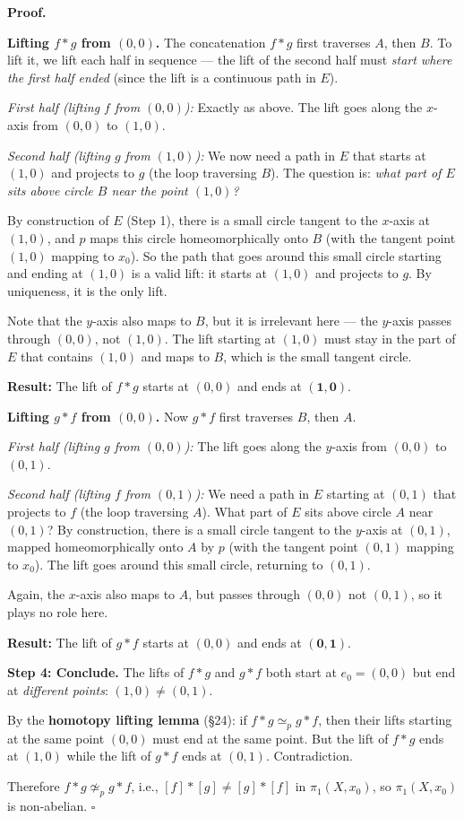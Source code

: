 \documentclass[11pt]{report}
\renewenvironment{proof}[1][Proof]{\noindent\textbf{#1.} }{\hfill$\square$\par\vspace{5pt}}
\begin{document}
\begin{proof}
\medskip

\textbf{Lifting $f * g$ from $(0,0)$.} The concatenation $f * g$ first traverses $A$, then $B$. To lift it, we lift each half in sequence --- the lift of the second half must \emph{start where the first half ended} (since the lift is a continuous path in $E$).

\textit{First half (lifting $f$ from $(0,0)$):} Exactly as above. The lift goes along the $x$-axis from $(0,0)$ to $(1,0)$.

\textit{Second half (lifting $g$ from $(1,0)$):} We now need a path in $E$ that starts at $(1,0)$ and projects to $g$ (the loop traversing $B$). The question is: \emph{what part of $E$ sits above circle $B$ near the point $(1,0)$?}

By construction of $E$ (Step 1), there is a small circle tangent to the $x$-axis at $(1,0)$, and $p$ maps this circle homeomorphically onto $B$ (with the tangent point $(1,0)$ mapping to $x_0$). So the path that goes around this small circle starting and ending at $(1,0)$ is a valid lift: it starts at $(1,0)$ and projects to $g$. By uniqueness, it is the only lift.

Note that the $y$-axis also maps to $B$, but it is irrelevant here --- the $y$-axis passes through $(0,0)$, not $(1,0)$. The lift starting at $(1,0)$ must stay in the part of $E$ that contains $(1,0)$ and maps to $B$, which is the small tangent circle.

\textbf{Result:} The lift of $f * g$ starts at $(0,0)$ and ends at $\mathbf{(1,0)}$.

\medskip

\textbf{Lifting $g * f$ from $(0,0)$.} Now $g * f$ first traverses $B$, then $A$.

\textit{First half (lifting $g$ from $(0,0)$):} The lift goes along the $y$-axis from $(0,0)$ to $(0,1)$.

\textit{Second half (lifting $f$ from $(0,1)$):} We need a path in $E$ starting at $(0,1)$ that projects to $f$ (the loop traversing $A$). What part of $E$ sits above circle $A$ near $(0,1)$? By construction, there is a small circle tangent to the $y$-axis at $(0,1)$, mapped homeomorphically onto $A$ by $p$ (with the tangent point $(0,1)$ mapping to $x_0$). The lift goes around this small circle, returning to $(0,1)$.

Again, the $x$-axis also maps to $A$, but passes through $(0,0)$ not $(0,1)$, so it plays no role here.

\textbf{Result:} The lift of $g * f$ starts at $(0,0)$ and ends at $\mathbf{(0,1)}$.

\textbf{Step 4: Conclude.} The lifts of $f * g$ and $g * f$ both start at $e_0 = (0, 0)$ but end at \emph{different points}: $(1, 0) \neq (0, 1)$.

By the \textbf{homotopy lifting lemma} (\S 24): if $f * g \simeq_p g * f$, then their lifts starting at the same point $(0,0)$ must end at the same point. But the lift of $f * g$ ends at $(1, 0)$ while the lift of $g * f$ ends at $(0, 1)$. Contradiction.

Therefore $f * g \not\simeq_p g * f$, i.e., $[f] * [g] \neq [g] * [f]$ in $\pi_1(X, x_0)$, so $\pi_1(X, x_0)$ is non-abelian.
\end{proof}
\end{document}
